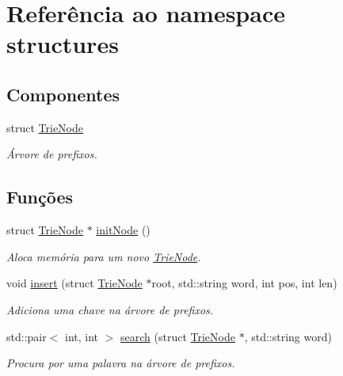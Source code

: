 \hypertarget{namespacestructures}{}\section{Referência ao namespace structures}
\label{namespacestructures}
\subsection*{Componentes}
\begin{DoxyCompactItemize}
\item 
struct \hyperlink{structstructures_1_1_trie_node}{Trie\+Node}
\begin{DoxyCompactList}\small\item\em Árvore de prefixos. \end{DoxyCompactList}\end{DoxyCompactItemize}
\subsection*{Funções}
\begin{DoxyCompactItemize}
\item 
struct \hyperlink{structstructures_1_1_trie_node}{Trie\+Node} $\ast$ \hyperlink{namespacestructures_afc28a3496cec97529bc5f5cff4df903b}{init\+Node} ()
\begin{DoxyCompactList}\small\item\em Aloca memória para um novo \hyperlink{structstructures_1_1_trie_node}{Trie\+Node}. \end{DoxyCompactList}\item 
void \hyperlink{namespacestructures_a4fb9d800dc8b1cd76e984a2f8e80aeae}{insert} (struct \hyperlink{structstructures_1_1_trie_node}{Trie\+Node} $\ast$root, std\+::string word, int pos, int len)
\begin{DoxyCompactList}\small\item\em Adiciona uma chave na árvore de prefixos. \end{DoxyCompactList}\item 
std\+::pair$<$ int, int $>$ \hyperlink{namespacestructures_ac7c63428ed7d247bf85b9fca19e7d7dd}{search} (struct \hyperlink{structstructures_1_1_trie_node}{Trie\+Node} $\ast$, std\+::string word)
\begin{DoxyCompactList}\small\item\em Procura por uma palavra na árvore de prefixos. \end{DoxyCompactList}\end{DoxyCompactItemize}


